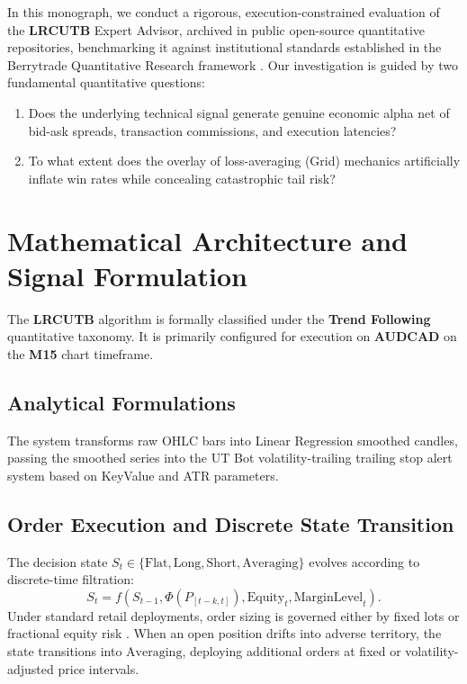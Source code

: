 \documentclass[11pt,a4paper]{article}
\begin{document}
In this monograph, we conduct a rigorous, execution-constrained evaluation of the \textbf{LRCUTB} Expert Advisor, archived in public open-source quantitative repositories, benchmarking it against institutional standards established in the Berrytrade Quantitative Research framework \cite{artsu2026illusion}. Our investigation is guided by two fundamental quantitative questions:
\begin{enumerate}
    \item Does the underlying technical signal generate genuine economic alpha net of bid-ask spreads, transaction commissions, and execution latencies?
    \item To what extent does the overlay of loss-averaging (Grid) mechanics artificially inflate win rates while concealing catastrophic tail risk?
\end{enumerate}

\section{Mathematical Architecture and Signal Formulation}
The \textbf{LRCUTB} algorithm is formally classified under the \textbf{Trend Following} quantitative taxonomy. It is primarily configured for execution on \textbf{AUDCAD} on the \textbf{M15} chart timeframe.

\subsection{Analytical Formulations}

The system transforms raw OHLC bars into Linear Regression smoothed candles, passing the smoothed series into the UT Bot volatility-trailing trailing stop alert system based on KeyValue and ATR parameters.


\subsection{Order Execution and Discrete State Transition}
The decision state $S_t \in \{\text{Flat}, \text{Long}, \text{Short}, \text{Averaging}\}$ evolves according to discrete-time filtration:
\begin{equation}
S_{t} = f(S_{t-1}, \Phi(P_{[t-k, t]}), \text{Equity}_t, \text{MarginLevel}_t).
\end{equation}
Under standard retail deployments, order sizing is governed either by fixed lots or fractional equity risk \cite{lopez2018advances, carhart1997persistence}. When an open position drifts into adverse territory, the state transitions into $\text{Averaging}$, deploying additional orders at fixed or volatility-adjusted price intervals.
\end{document}
